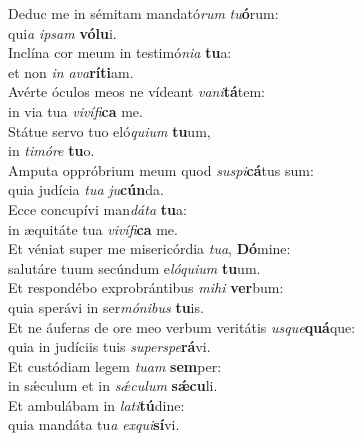\oddverse Deduc me in sémitam mandató\textit{rum} \textit{tu}\textbf{ó}rum:~\*\\
\oddverse qui\textit{a} \textit{i}\textit{psam} \textbf{vó}\textbf{lu}i.\\
\evenverse Inclína cor meum in testimó\textit{ni}\textit{a} \textbf{tu}a:~\*\\
\evenverse et non \textit{in} \textit{a}\textit{va}\textbf{rí}\textbf{ti}am.\\
\oddverse Avérte óculos meos ne vídeant \textit{va}\textit{ni}\textbf{tá}tem:~\*\\
\oddverse in via tua \textit{vi}\textit{ví}\textit{fi}\textbf{ca} me.\\
\evenverse Státue servo tuo eló\textit{qui}\textit{um} \textbf{tu}um,~\*\\
\evenverse in \textit{ti}\textit{mó}\textit{re} \textbf{tu}o.\\
\oddverse Amputa oppróbrium meum quod \textit{su}\textit{spi}\textbf{cá}tus sum:~\*\\
\oddverse quia judícia \textit{tu}\textit{a} \textit{ju}\textbf{cún}da.\\
\evenverse Ecce concupívi man\textit{dá}\textit{ta} \textbf{tu}a:~\*\\
\evenverse in æquitáte tua \textit{vi}\textit{ví}\textit{fi}\textbf{ca} me.\\
\oddverse Et véniat super me misericórdia \textit{tu}\textit{a}, \textbf{Dó}mine:~\*\\
\oddverse salutáre tuum secúndum e\textit{ló}\textit{qui}\textit{um} \textbf{tu}um.\\
\evenverse Et respondébo exprobrántibus \textit{mi}\textit{hi} \textbf{ver}bum:~\*\\
\evenverse quia sperávi in ser\textit{mó}\textit{ni}\textit{bus} \textbf{tu}is.\\
\oddverse Et ne áuferas de ore meo verbum veritátis \textit{us}\textit{que}\textbf{quá}que:~\*\\
\oddverse quia in judíciis tuis \textit{su}\textit{per}\textit{spe}\textbf{rá}vi.\\
\evenverse Et custódiam legem \textit{tu}\textit{am} \textbf{sem}per:~\*\\
\evenverse in sǽculum et in \textit{sǽ}\textit{cu}\textit{lum} \textbf{sǽ}\textbf{cu}li.\\
\oddverse Et ambulábam in \textit{la}\textit{ti}\textbf{tú}dine:~\*\\
\oddverse quia mandáta tu\textit{a} \textit{ex}\textit{qui}\textbf{sí}vi.\\
